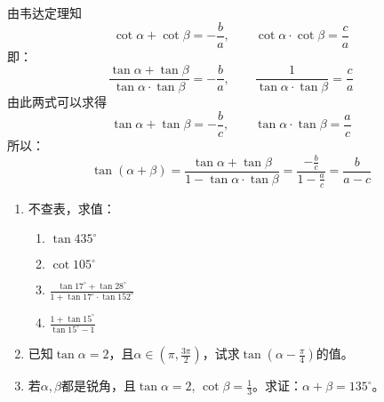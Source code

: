 \begin{solution}
由韦达定理知
\[\cot\alpha+\cot\beta=-\frac{b}{a},\qquad \cot\alpha\cdot \cot\beta=\frac{c}{a}\]    
即：
\[\frac{\tan\alpha+\tan\beta}{\tan\alpha\cdot \tan\beta}=-\frac{b}{a},\qquad \frac{1}{\tan\alpha\cdot \tan\beta}=\frac{c}{a}\]  
由此两式可以求得 
\[\tan\alpha+\tan\beta=-\frac{b}{c},\qquad \tan\alpha\cdot \tan\beta=\frac{a}{c}\]
所以：
\[\tan(\alpha+\beta)=\frac{\tan\alpha+\tan\beta}{1-\tan\alpha\cdot \tan\beta}=\frac{-\frac{b}{c}}{1-\frac{a}{c}}=\frac{b}{a-c}\]
\end{solution}

\begin{ex}
\begin{enumerate}
    \item 不查表，求值：
\begin{multicols}{2}
\begin{enumerate}
    \item $\tan 435^{\circ}$
    \item $\cot 105^{\circ}$
    \item $\frac{\tan 17^{\circ}+\tan 28^{\circ}}{1+\tan 17^{\circ}\cdot \tan 152^{\circ}}$
    \item $\frac{1+\tan 15^{\circ}}{\tan 15^{\circ}-1}$
\end{enumerate}
\end{multicols}

\item 已知$\tan\alpha=2$，且$\alpha\in\left(\pi,\frac{3\pi}{2}\right)$，试求$\tan\left(\alpha-\frac{\pi}{4}\right)$的值。
\item 若$\alpha,\beta$都是锐角，且$\tan\alpha=2$, $\cot\beta=\frac{1}{3}$。求证：$\alpha+\beta =135^{\circ}$。
\end{enumerate} 
\end{ex}

